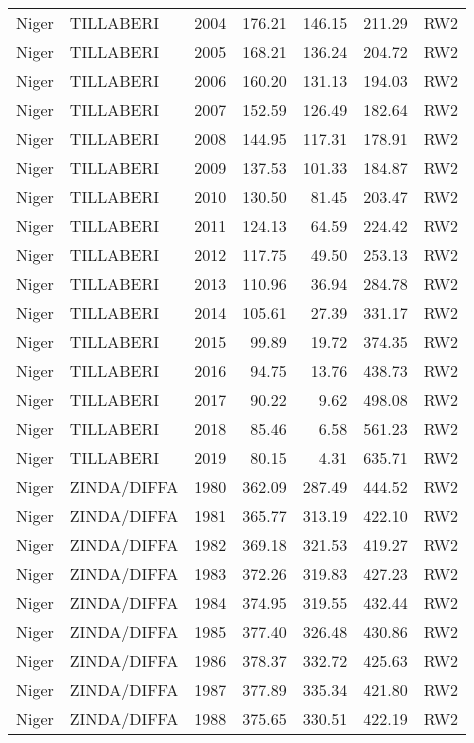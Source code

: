 \begin{longtable}{lllrrrl}
  Niger & TILLABERI & 2004 & 176.21 & 146.15 & 211.29 & RW2 \\ 
  Niger & TILLABERI & 2005 & 168.21 & 136.24 & 204.72 & RW2 \\ 
  Niger & TILLABERI & 2006 & 160.20 & 131.13 & 194.03 & RW2 \\ 
  Niger & TILLABERI & 2007 & 152.59 & 126.49 & 182.64 & RW2 \\ 
  Niger & TILLABERI & 2008 & 144.95 & 117.31 & 178.91 & RW2 \\ 
  Niger & TILLABERI & 2009 & 137.53 & 101.33 & 184.87 & RW2 \\ 
  Niger & TILLABERI & 2010 & 130.50 & 81.45 & 203.47 & RW2 \\ 
  Niger & TILLABERI & 2011 & 124.13 & 64.59 & 224.42 & RW2 \\ 
  Niger & TILLABERI & 2012 & 117.75 & 49.50 & 253.13 & RW2 \\ 
  Niger & TILLABERI & 2013 & 110.96 & 36.94 & 284.78 & RW2 \\ 
  Niger & TILLABERI & 2014 & 105.61 & 27.39 & 331.17 & RW2 \\ 
  Niger & TILLABERI & 2015 & 99.89 & 19.72 & 374.35 & RW2 \\ 
  Niger & TILLABERI & 2016 & 94.75 & 13.76 & 438.73 & RW2 \\ 
  Niger & TILLABERI & 2017 & 90.22 & 9.62 & 498.08 & RW2 \\ 
  Niger & TILLABERI & 2018 & 85.46 & 6.58 & 561.23 & RW2 \\ 
  Niger & TILLABERI & 2019 & 80.15 & 4.31 & 635.71 & RW2 \\ 
  Niger & ZINDA/DIFFA & 1980 & 362.09 & 287.49 & 444.52 & RW2 \\ 
  Niger & ZINDA/DIFFA & 1981 & 365.77 & 313.19 & 422.10 & RW2 \\ 
  Niger & ZINDA/DIFFA & 1982 & 369.18 & 321.53 & 419.27 & RW2 \\ 
  Niger & ZINDA/DIFFA & 1983 & 372.26 & 319.83 & 427.23 & RW2 \\ 
  Niger & ZINDA/DIFFA & 1984 & 374.95 & 319.55 & 432.44 & RW2 \\ 
  Niger & ZINDA/DIFFA & 1985 & 377.40 & 326.48 & 430.86 & RW2 \\ 
  Niger & ZINDA/DIFFA & 1986 & 378.37 & 332.72 & 425.63 & RW2 \\ 
  Niger & ZINDA/DIFFA & 1987 & 377.89 & 335.34 & 421.80 & RW2 \\ 
  Niger & ZINDA/DIFFA & 1988 & 375.65 & 330.51 & 422.19 & RW2 \\ 

\end{longtable}
